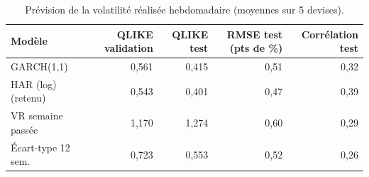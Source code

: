 \begin{table}[ht]
\centering
\small
\caption{Prévision de la volatilité réalisée hebdomadaire (moyennes sur 5 devises).}
\label{tab:vol}
\begin{tabular}{lrrrr}
\toprule
Modèle & QLIKE validation & QLIKE test & RMSE test (pts de \%) & Corrélation test \\
\midrule
GARCH(1,1) & 0,561 & 0,415 & 0,51 & 0,32 \\
HAR (log) (retenu) & 0,543 & 0,401 & 0,47 & 0,39 \\
VR semaine passée & 1,170 & 1,274 & 0,60 & 0,29 \\
Écart-type 12 sem. & 0,723 & 0,553 & 0,52 & 0,26 \\
\bottomrule
\end{tabular}
\end{table}

